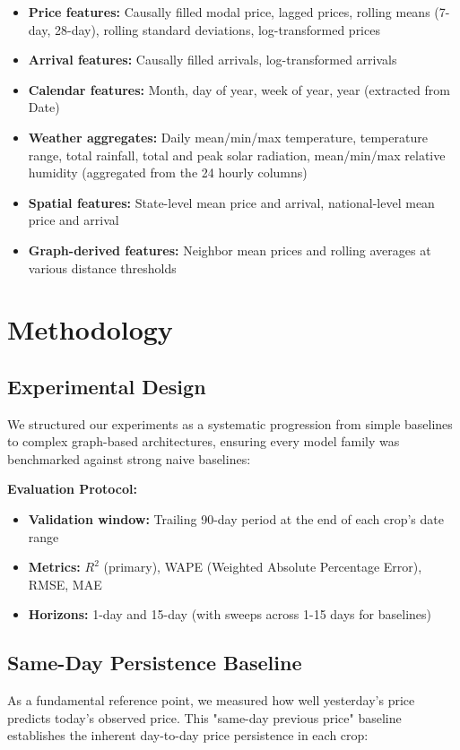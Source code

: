 \documentclass[12pt,a4paper]{article}
\begin{document}
\begin{itemize}
\item \textbf{Price features:} Causally filled modal price, lagged prices, rolling means (7-day, 28-day), rolling standard deviations, log-transformed prices
\item \textbf{Arrival features:} Causally filled arrivals, log-transformed arrivals
\item \textbf{Calendar features:} Month, day of year, week of year, year (extracted from Date)
\item \textbf{Weather aggregates:} Daily mean/min/max temperature, temperature range, total rainfall, total and peak solar radiation, mean/min/max relative humidity (aggregated from the 24 hourly columns)
\item \textbf{Spatial features:} State-level mean price and arrival, national-level mean price and arrival
\item \textbf{Graph-derived features:} Neighbor mean prices and rolling averages at various distance thresholds
\end{itemize}
\section{Methodology}
\subsection{Experimental Design}
We structured our experiments as a systematic progression from simple baselines to complex graph-based architectures, ensuring every model family was benchmarked against strong naive baselines:

\noindent\textbf{Evaluation Protocol:}

\begin{itemize}
\item \textbf{Validation window:} Trailing 90-day period at the end of each crop's date range
\item \textbf{Metrics:} $R^2$ (primary), WAPE (Weighted Absolute Percentage Error), RMSE, MAE
\item \textbf{Horizons:} 1-day and 15-day (with sweeps across 1-15 days for baselines)
\end{itemize}
\subsection{Same-Day Persistence Baseline}
As a fundamental reference point, we measured how well yesterday's price predicts today's observed price. This "same-day previous price" baseline establishes the inherent day-to-day price persistence in each crop:
\end{document}
